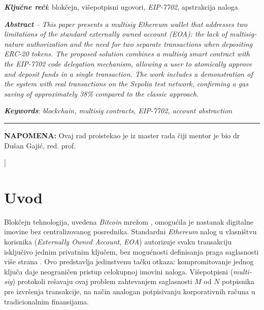 \documentclass[10pt,a4paper]{article}
\newcommand{\en}[1]{\textit{\textenglish{#1}}}
\begin{document}
{\begin{minipage}[t]{0.48\textwidth}
     \medskip
     \noindent\textbf{\textit{Klju\v cne re\v ci}}: blok\v cejn, vi\v sepotpisni ugovori, \en{EIP-7702}, apstrakcija naloga
   \end{minipage}%
   \hfill
   \begin{minipage}[t]{0.48\textwidth}
     \noindent\textbf{\en{Abstract}} -- \en{This paper presents a multisig Ethereum wallet that addresses two limitations of the standard externally owned account (EOA): the lack of multisignature authorization and the need for two separate transactions when depositing ERC-20 tokens. The proposed solution combines a multisig smart contract with the EIP-7702 code delegation mechanism, allowing a user to atomically approve and deposit funds in a single transaction. The work includes a demonstration of the system with real transactions on the Sepolia test network, confirming a gas saving of approximately 38\% compared to the classic approach.}

     \medskip
     \noindent\textbf{\en{Keywords}}: \en{blockchain, multisig contracts, EIP-7702, account abstraction}
   \end{minipage}

   \vspace{0.4cm}
   \noindent\rule{\textwidth}{0.4pt}

   \vspace{0.2cm}
   \noindent\textbf{NAPOMENA:} Ovaj rad proistekao je iz master rada \v ciji mentor je bio dr Du\v san Gaji\' c, red. prof.

   \vspace{0.3cm}
  }
]

\section{Uvod}

Blok\v cejn tehnologija, uvedena \en{Bitcoin} mre\v zom \cite{nakamotou}, omogu\'cila je nastanak digitalne imovine bez centralizovanog posrednika. Standardni \en{Ethereum} nalog u vlasni\v stvu korisnika (\en{Externally Owned Account}, \en{EOA}) autorizuje svaku transakciju isklju\v civo jednim privatnim klju\v cem, bez mogu\'cnosti definisanja praga saglasnosti vi\v se strana \cite{antonopoulos2018}. Ovo predstavlja jedinstvenu ta\v cku otkaza: kompromitovanje jednog klju\v ca daje neograni\v cen pristup celokupnoj imovini naloga. Vi\v sepotpisni (\en{multisig}) protokoli re\v savaju ovaj problem zahtevanjem saglasnosti $M$ od $N$ potpisnika pre izvr\v senja transakcije, na na\v cin analogan potpisivanju korporativnih ra\v cuna u tradicionalnim finansijama.
\end{document}
